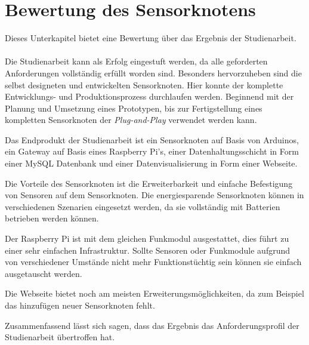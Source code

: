 \section{Bewertung des Sensorknotens}
Dieses Unterkapitel bietet eine Bewertung über das Ergebnis der Studienarbeit.
\paragraph{}
Die Studienarbeit kann als Erfolg eingestuft werden, da alle geforderten Anforderungen vollständig erfüllt worden sind. Besonders hervorzuheben sind die selbst designeten und entwickelten Sensorknoten. Hier konnte der komplette Entwicklungs- und Produktionsprozess durchlaufen werden. Beginnend mit der Planung und Umsetzung eines Prototypen, bis zur Fertigstellung eines kompletten Sensorknoten der \textit{Plug-and-Play} verwendet werden kann.

Das Endprodukt der Studienarbeit ist ein Sensorknoten auf Basis von Arduinos, ein Gateway auf Basis eines Raspberry Pi’s, einer Datenhaltungsschicht in Form einer MySQL Datenbank und einer Datenvisualisierung in Form einer Webseite.

Die Vorteile des Sensorknoten ist die Erweiterbarkeit und einfache Befestigung von Sensoren auf dem Sensorknoten. Die energiesparende Sensorknoten können in verschiedenen Szenarien eingesetzt werden, da sie vollständig mit Batterien betrieben werden können. 

Der Raspberry Pi ist mit dem gleichen Funkmodul ausgestattet, dies führt zu einer sehr einfachen Infrastruktur. Sollte Sensoren oder Funkmodule aufgrund von verschiedener Umstände nicht mehr Funktionstüchtig sein können sie einfach ausgetauscht werden.

Die Webseite bietet noch am meisten Erweiterungsmöglichkeiten, da zum Beispiel das hinzufügen neuer Sensorknoten fehlt.

Zusammenfassend lässt sich sagen, dass das Ergebnis das Anforderungsprofil der Studienarbeit übertroffen hat.





